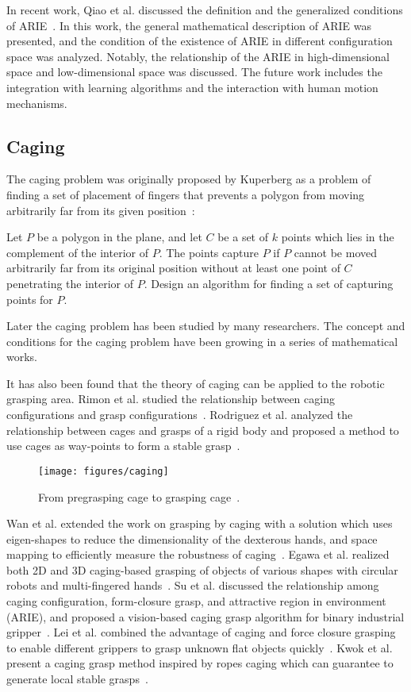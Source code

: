 \documentclass[journal,twoside,web]{ieeecolor}
\begin{document}
In recent work, Qiao et al. discussed the definition and the generalized conditions of ARIE~\cite{Qiao2015}. In this work, the general mathematical description of ARIE was presented, and the condition of the existence of ARIE in different configuration space was analyzed. Notably, the relationship of the ARIE in high-dimensional space and low-dimensional space was discussed. The future work includes the integration with learning algorithms and the interaction with human motion mechanisms.


\subsection{Caging}
\label{subsec:caging}

The caging problem was originally proposed by Kuperberg as a problem of finding a set of placement of fingers that prevents a polygon from moving arbitrarily far from its given position~\cite{kuperberg1990problems}:

Let $P$ be a polygon in the plane, and let $C$ be a set of $k$ points which lies in the complement of the interior of $P$. The points capture $P$ if $P$ cannot be moved arbitrarily far from its original position without at least one point of $C$ penetrating the interior of $P$. Design an algorithm for finding a set of capturing points for $P$. 

Later the caging problem has been studied by many researchers. The concept and conditions for the caging problem have been growing in a series of mathematical works. 

It has also been found that the theory of caging can be applied to the robotic grasping area. 
Rimon et al. studied the relationship between caging configurations and grasp configurations~\cite{Rimon1999}. 
Rodriguez et al. analyzed the relationship between cages and grasps of a rigid body and proposed a method to use cages as way-points to form a stable grasp~\cite{Rodriguez2012b}. 
\begin{figure}[htbp]
    \centering
    \texttt{[image: figures/caging]}
    \caption{From pregrasping cage to grasping cage~\cite{Rodriguez2012b}.}
    \label{fig:caging}
\end{figure}
Wan et al. extended the work on grasping by caging with a solution which uses eigen-shapes to reduce the dimensionality of the dexterous hands, and space mapping to efficiently measure the robustness of caging~\cite{Wan2013}.
Egawa et al. realized both 2D and 3D caging-based grasping of objects of various shapes with circular robots and multi-fingered hands~\cite{Egawa2015}.
Su et al. discussed the relationship among caging configuration, form-closure grasp, and attractive region in environment (ARIE), and proposed a vision-based caging grasp algorithm for binary industrial gripper~\cite{Su2015a,Su2015b,Su2017}.
Lei et al. combined the advantage of caging and force closure grasping to enable different grippers to grasp unknown flat objects quickly~\cite{Lei2016}.
Kwok et al. present a caging grasp method inspired by ropes caging which can guarantee to generate local stable grasps~\cite{Kwok2016}.
\end{document}
